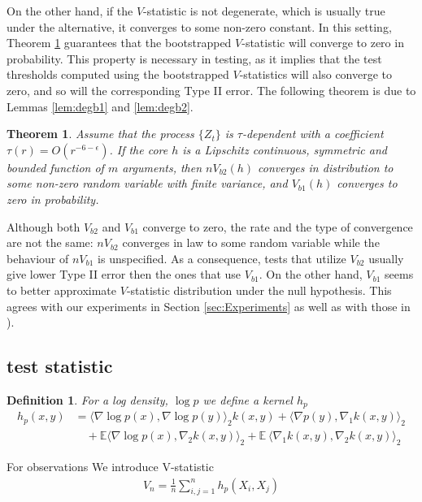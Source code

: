 \documentclass{article}
\newtheorem{definition}{Definition}
\newtheorem{Theorem}{Theorem}
\newcommand{\ev}{\mathbb{E}}
\begin{document}
On the other hand, if the $V$-statistic is not degenerate, which is usually true under the alternative, it converges to some non-zero constant. In this setting, Theorem \ref{th:mainTwo} guarantees that the bootstrapped $V$-statistic will converge to zero in probability. This property is necessary in testing, as it implies that the test thresholds computed using the bootstrapped $V$-statistics will also converge to zero, and so will the corresponding Type II error.    The following theorem is due to Lemmas \ref{lem:degb1} and \ref{lem:degb2}.
\begin{Theorem}
\label{th:mainTwo}
Assume that the process $\{Z_t\}$ is $\tau$-dependent with a coefficient $\tau(r) = O(r^{-6-\epsilon})$. If the core $h$ is  a Lipschitz continuous, symmetric and bounded function of $m$ arguments,  then $n V_{b2}(h)$ converges in distribution to some non-zero random variable with finite variance, and $V_{b1}(h)$  converges to zero in probability. 
\end{Theorem}
Although both $V_{b2}$ and $V_{b1}$  converge to zero, the rate and the type of convergence are not the same: $n V_{b2}$ converges in law to some random variable while the behaviour of $n V_{b1}$ is unspecified. As a consequence, tests that utilize $V_{b2}$ usually give lower Type II error then the ones that use $V_{b1}$. On the other hand, $V_{b1}$ seems to better approximate $V$-statistic distribution under the null hypothesis. This agrees with our experiments in Section \ref{sec:Experiments} as well as with those in \cite[Section 5]{leucht_dependent_2013}).  




\subsection{test statistic}

\begin{definition}
 For a log density, $\log p $ we define a kernel $h_p$
 \begin{align*}
  h_p(x,y) &= \langle \nabla \log p(x) , \nabla\log p(y) \rangle_{2} k(x,y) +  \langle \nabla p(y),  \nabla_1 k(x,y) \rangle_{2} \\
  & \quad +  \ev \langle \nabla  \log p(x), \nabla_{2}  k(x,y) \rangle_{2} +  \ev\ \langle  \nabla_1 k(x,y), \nabla_2 k(x,y) \rangle_{2}
 \end{align*}
\end{definition}

For observations We introduce V-statistic 
\begin{align}
 V_n = \frac 1 n \sum_{i,j=1}^n h_p(X_i,X_j)
\end{align}
\end{document}

